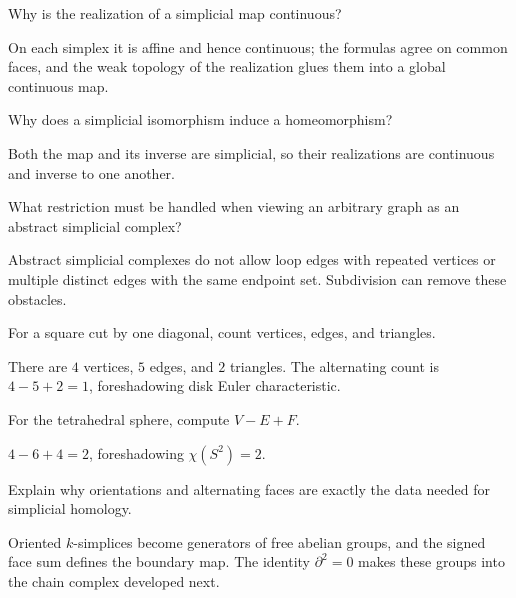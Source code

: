 \begin{problem}\label{prob:viii15-19}
Why is the realization of a simplicial map continuous?
\end{problem}
\begin{solution}
On each simplex it is affine and hence continuous; the formulas agree on common faces, and the weak topology of the realization glues them into a global continuous map.
\end{solution}

\begin{problem}\label{prob:viii15-20}
Why does a simplicial isomorphism induce a homeomorphism?
\end{problem}
\begin{solution}
Both the map and its inverse are simplicial, so their realizations are continuous and inverse to one another.
\end{solution}

\begin{problem}\label{prob:viii15-21}
What restriction must be handled when viewing an arbitrary graph as an abstract simplicial complex?
\end{problem}
\begin{solution}
Abstract simplicial complexes do not allow loop edges with repeated vertices or multiple distinct edges with the same endpoint set. Subdivision can remove these obstacles.
\end{solution}

\begin{problem}\label{prob:viii15-22}
For a square cut by one diagonal, count vertices, edges, and triangles.
\end{problem}
\begin{solution}
There are \(4\) vertices, \(5\) edges, and \(2\) triangles. The alternating count is \(4-5+2=1\), foreshadowing disk Euler characteristic.
\end{solution}

\begin{problem}\label{prob:viii15-23}
For the tetrahedral sphere, compute \(V-E+F\).
\end{problem}
\begin{solution}
\(4-6+4=2\), foreshadowing \(\chi(S^2)=2\).
\end{solution}

\begin{problem}\label{prob:viii15-24}
Explain why orientations and alternating faces are exactly the data needed for simplicial homology.
\end{problem}
\begin{solution}
Oriented \(k\)-simplices become generators of free abelian groups, and the signed face sum defines the boundary map. The identity \(\partial^2=0\) makes these groups into the chain complex developed next.
\end{solution}
